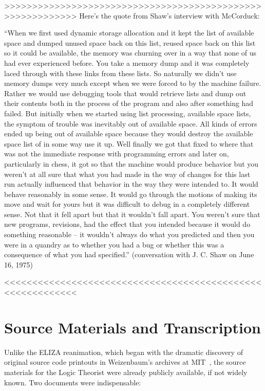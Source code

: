 \documentclass[journal]{IEEEtran}
\begin{document}
>>>>>>>>>>>>>>>>>>>>>>>>>>>>>>>>>>>>>>>>>>>>>>>>>>>>>>>>>>>
Here's the quote from Shaw's interview with McCorduck:

``When we first used dynamic storage allocation and it kept the list
of available space and dumped unused space back on this list, reused
space back on this list so it could be available, the memory was
churning over in a way that none of us had ever experienced
before. You take a memory dump and it was completely laced through
with these links from these lists. So naturally we didn't use memory
dumps very much except when we were forced to by the machine
failure. Rather we would use debugging tools that would retrieve lists
and dump out their contents both in the process of the program and
also after something had failed. But initially when we started using
list processing, available space lists, the symptom of trouble was
inevitably out of available space. All kinds of errors ended up being
out of available space because they would destroy the available space
list of in some way use it up. Well finally we got that fixed to where
that was not the immediate response with programming errors and later
on, particularly in chess, it got so that the machine would produce
behavior but you weren't at all sure that what you had made in the way
of changes for this last run actually influenced that behavior in the
way they were intended to. It would behave reasonably in some
sense. It would go through the motions of making its move and wait for
yours but it was difficult to debug in a completely different
sense. Not that it fell apart but that it wouldn't fall apart. You
weren't sure that new programs, revisions, had the effect that you
intended because it would do something reasonable -- it wouldn't
always do what you predicted and then you were in a quandry as to
whether you had a bug or whether this was a consequence of what you
had specified.'' (conversation with J. C. Shaw on June 16, 1975)

<<<<<<<<<<<<<<<<<<<<<<<<<<<<<<<<<<<<<<<<<<<<<<<<<<<<<<<<<<<


\section{Source Materials and Transcription}
\label{sec:sources}

Unlike the ELIZA reanimation, which began with the dramatic discovery
of original source code printouts in Weizenbaum's archives at
MIT~\cite{lane2025eliza}, the source materials for the Logic Theorist
were already publicly available, if not widely known. Two documents
were indispensable:
\end{document}
